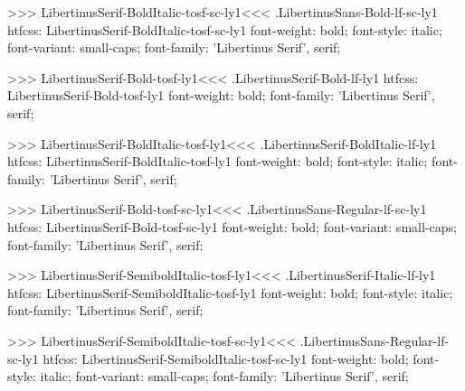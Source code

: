 >>>
\<LibertinusSerif-BoldItalic-tosf-sc-ly1\><<<
.LibertinusSans-Bold-lf-sc-ly1
htfcss:  LibertinusSerif-BoldItalic-tosf-sc-ly1  font-weight: bold; font-style: italic; font-variant: small-caps; font-family: 'Libertinus Serif', serif;

>>>
\<LibertinusSerif-Bold-tosf-ly1\><<<
.LibertinusSerif-Bold-lf-ly1
htfcss:  LibertinusSerif-Bold-tosf-ly1  font-weight: bold; font-family: 'Libertinus Serif', serif;

>>>
\<LibertinusSerif-BoldItalic-tosf-ly1\><<<
.LibertinusSerif-BoldItalic-lf-ly1
htfcss:  LibertinusSerif-BoldItalic-tosf-ly1  font-weight: bold; font-style: italic; font-family: 'Libertinus Serif', serif;

>>>
\<LibertinusSerif-Bold-tosf-sc-ly1\><<<
.LibertinusSans-Regular-lf-sc-ly1
htfcss:  LibertinusSerif-Bold-tosf-sc-ly1  font-weight: bold; font-variant: small-caps; font-family: 'Libertinus Serif', serif;

>>>
\<LibertinusSerif-SemiboldItalic-tosf-ly1\><<<
.LibertinusSerif-Italic-lf-ly1
htfcss:  LibertinusSerif-SemiboldItalic-tosf-ly1  font-weight: bold; font-style: italic; font-family: 'Libertinus Serif', serif;

>>>
\<LibertinusSerif-SemiboldItalic-tosf-sc-ly1\><<<
.LibertinusSans-Regular-lf-sc-ly1
htfcss:  LibertinusSerif-SemiboldItalic-tosf-sc-ly1  font-weight: bold; font-style: italic; font-variant: small-caps; font-family: 'Libertinus Serif', serif;

